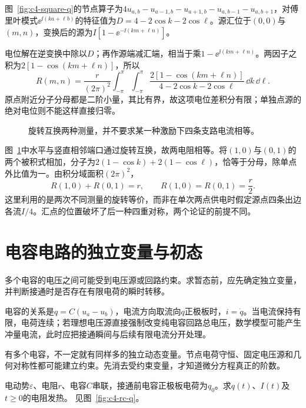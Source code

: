 \begin{solution}
图~\ref{fig:c4-square-q}的节点算子为$4u_{a,b}-u_{a-1,b}-u_{a+1,b}-u_{a,b-1}-u_{a,b+1}$，对傅里叶模式$\ee^{\ii(ka+\ell b)}$的特征值为$D=4-2\cos k-2\cos\ell$。源汇位于$(0,0)$与$(m,n)$，变换后的源为$I[1-\ee^{-\ii(km+\ell n)}]$。

电位解在逆变换中除以$D$；再作源端减汇端，相当于乘$1-\ee^{\ii(km+\ell n)}$。两因子之积为$2[1-\cos(km+\ell n)]$，所以
\[
 R(m,n)=\frac r{(2\pi)^2}\int_{-\pi}^{\pi}\!\int_{-\pi}^{\pi}
 \frac{2[1-\cos(km+\ell n)]}{4-2\cos k-2\cos\ell}\,\dd k\,\dd\ell.
\]
原点附近分子分母都是二阶小量，其比有界，故这项电位差积分有限；单独点源的绝对电位则不能这样直接归零。
\begin{figure}[H]\centering
{}
\caption{旋转互换两种测量，并不要求某一种激励下四条支路电流相等。}\label{fig:c4-square-s}
\end{figure}
图~\ref{fig:c4-square-s}中水平与竖直相邻端口通过旋转互换，故两电阻相等。将$(1,0)$与$(0,1)$的两个被积式相加，分子为$2(1-\cos k)+2(1-\cos\ell)$，恰等于分母，除单点外比值为一。由积分域面积$(2\pi)^2$，
\[
 R(1,0)+R(0,1)=r,\qquad\boxed{R(1,0)=R(0,1)=\frac r2}.
\]
这里利用的是两次不同测量的旋转等价，而非在单次两点供电时假定源点四条出边各流$I/4$。汇点的位置破坏了后一种四重对称，两个论证的前提不同。
\end{solution}


\section{电容电路的独立变量与初态}
多个电容的电压之间可能受到电压源或回路约束。求暂态前，应先确定独立变量，并判断接通时是否存在有限电荷的瞬时转移。

电容的关系是$q=C(u_a-u_b)$，电流方向取流向$q$正极板时，$i=\dot q$。当电流保持有限，电荷连续；若理想电压源直接强制改变纯电容回路总电压，数学模型可能产生冲量电流，此时应把接通瞬间与后续有限电流分开处理。

有多个电容，不一定就有同样多的独立动态变量。节点电荷守恒、固定电压源和几何对称性都可能建立约束。先消去受约束变量，才知道微分方程真正的阶数。

\begin{example}[普通RC阶跃的完整初值解]\label{ex:c4-rc}
电动势$\varepsilon$、电阻$r$、电容$C$串联，接通前电容正极板电荷为$q_0$。求$q(t)$、$I(t)$及$t\ge0$的电阻发热。 见图~\ref{fig:c4-rc-q}。
\end{example}

